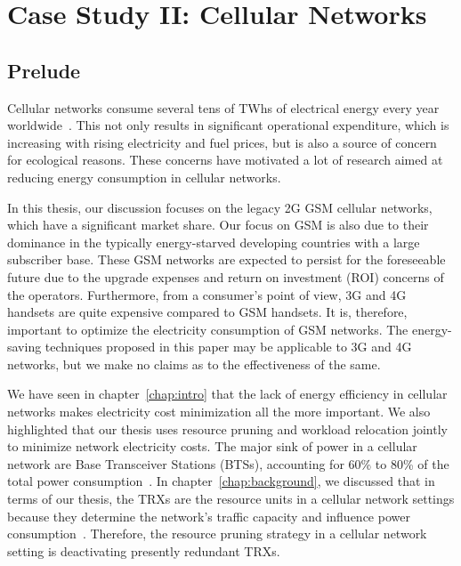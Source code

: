 \chapter{Case Study II: Cellular Networks}
\label{chap:casestudy2}
\section{Prelude}
Cellular networks consume several tens of TWhs of electrical energy
every year worldwide~\cite{Oh:Comm:2011}. This not only results
in significant operational expenditure, which is increasing with
rising electricity and fuel prices, but is also a source of concern
for ecological reasons. These concerns have motivated a lot of research aimed at reducing energy consumption in cellular networks.

In this thesis, our discussion focuses on the legacy 2G GSM cellular networks, which have a significant market share. Our focus on GSM is also due to their dominance in the typically energy-starved developing countries with a large subscriber base. These GSM networks are expected to persist for the foreseeable future due to the upgrade expenses and return on investment (ROI) concerns of the operators. Furthermore, from a consumer's point of view, 3G and 4G handsets are quite expensive compared to GSM handsets. It is, therefore, important to optimize the electricity consumption of GSM networks. The energy-saving techniques proposed in this paper may be applicable to 3G and 4G networks, but we make no claims as to the effectiveness of the same. 
 
We have seen in chapter~\ref{chap:intro} that the lack of energy efficiency in cellular networks makes electricity cost minimization all the more important. We also highlighted that our thesis uses resource pruning and workload relocation jointly to minimize network electricity costs. The major sink of power in a cellular network are Base Transceiver Stations (BTSs), accounting for 60\% to 80\% of the total power consumption~\cite{Louhi:2007:BTSPower:INTELEC,Oh:Comm:2011,Peng:2011:BTSSaving:Mobicom}. In chapter~\ref{chap:background}, we discussed that in terms of our thesis, the TRXs are the resource units in a cellular network settings because they determine the network's traffic capacity and influence power consumption~\cite{Peng:2011:BTSSaving:Mobicom}. Therefore, the resource pruning strategy in a cellular network setting is deactivating presently redundant TRXs. 


